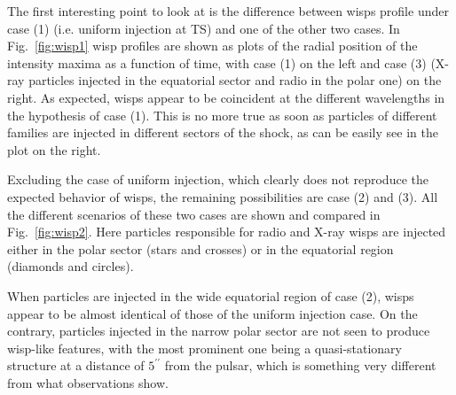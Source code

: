 
The first interesting point to look at is the difference between wisps profile under case (1) (i.e. uniform injection at TS) and one of the other two cases. In Fig.~\ref{fig:wisp1} wisp profiles are shown as plots of the radial position of the intensity maxima as a function of time, with case (1) on the left and case (3) (X-ray particles injected in the equatorial sector and radio in the polar one) on the right.
As expected, wisps appear to be coincident at the different wavelengths in the hypothesis of case (1). 
This is no more true as soon as particles of different families are injected in different sectors of the shock, as can be easily see in the plot on the right.


Excluding the case of uniform injection, which clearly does not reproduce the expected behavior of wisps, the remaining  possibilities are case (2) and (3). 
All the different scenarios of these two cases are shown and compared in Fig.~\ref{fig:wisp2}. 
Here particles responsible for radio and X-ray wisps are injected either in the polar sector (stars and crosses) or in the equatorial region (diamonds and circles).

When particles are injected in the wide equatorial region of case (2), wisps appear to be almost identical of those of the uniform injection case. 
On the contrary, particles injected in the narrow polar sector are not seen to produce wisp-like features, with the most prominent one being a quasi-stationary structure at a distance of $5^{\prime\prime}$ from the pulsar, which is something very different from what observations show.


